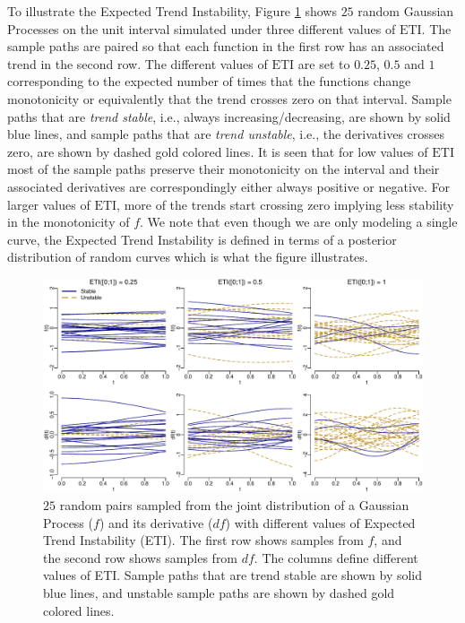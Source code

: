 \documentclass[
  11pt,
]{article}
\theoremstyle{nonumberplain}
\begin{document}
To illustrate the Expected Trend Instability, Figure
\ref{fig:ETIexample} shows \(25\) random Gaussian Processes on the unit
interval simulated under three different values of \(\mathrm{ETI}\). The
sample paths are paired so that each function in the first row has an
associated trend in the second row. The different values of
\(\mathrm{ETI}\) are set to \(0.25\), \(0.5\) and \(1\) corresponding to
the expected number of times that the functions change monotonicity or
equivalently that the trend crosses zero on that interval. Sample paths
that are \textit{trend stable}, i.e., always increasing/decreasing, are
shown by solid blue lines, and sample paths that are
\textit{trend unstable}, i.e., the derivatives crosses zero, are shown
by dashed gold colored lines. It is seen that for low values of
\(\mathrm{ETI}\) most of the sample paths preserve their monotonicity on
the interval and their associated derivatives are correspondingly either
always positive or negative. For larger values of \(\mathrm{ETI}\), more
of the trends start crossing zero implying less stability in the
monotonicity of \(f\). We note that even though we are only modeling a
single curve, the Expected Trend Instability is defined in terms of a
posterior distribution of random curves which is what the figure
illustrates.

\begin{figure}[htb]
\center\includegraphics{ETIexample}
\caption{$25$ random pairs sampled from the joint distribution of a Gaussian Process ($f$) and its derivative ($df$) with different values of Expected Trend Instability (ETI). The first row shows samples from $f$, and the second row shows samples from $df$. The columns define different values of ETI. Sample paths that are trend stable are shown by solid blue lines, and unstable sample paths are shown by dashed gold colored lines.}
\label{fig:ETIexample}
\end{figure}
\end{document}
